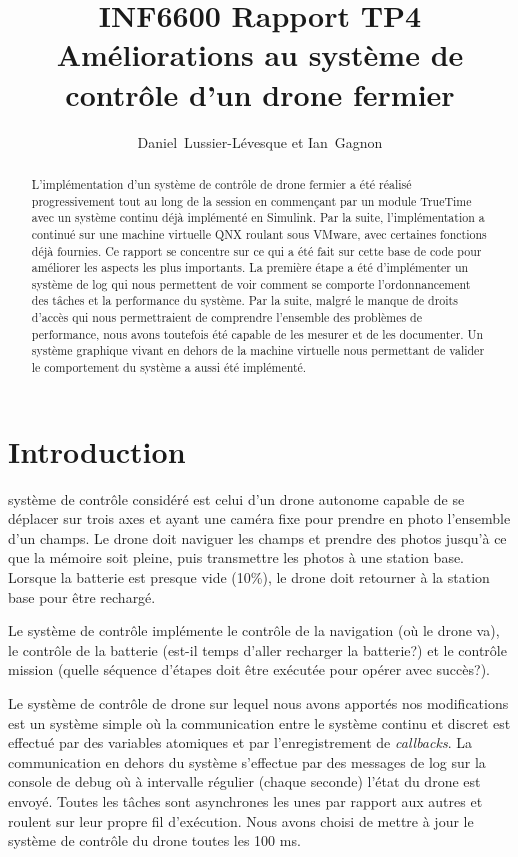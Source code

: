 \documentclass[journal]{IEEEtran}
\begin{document}
\title{INF6600 Rapport TP4 \\ Améliorations au système de contrôle d'un drone fermier}


\author{Daniel~Lussier-Lévesque et Ian~Gagnon}

\maketitle

\begin{abstract}
L'implémentation d'un système de contrôle de drone fermier a été réalisé progressivement tout au long de la session en commençant par un module TrueTime avec un système continu déjà implémenté en Simulink. Par la suite, l'implémentation a continué sur une machine virtuelle QNX roulant sous VMware, avec certaines fonctions déjà fournies. Ce rapport se concentre sur ce qui a été fait sur cette base de code pour améliorer les aspects les plus importants. La première étape a été d'implémenter un système de log qui nous permettent de voir comment se comporte l'ordonnancement des tâches et la performance du système. Par la suite, malgré le manque de droits d'accès qui nous permettraient de comprendre l'ensemble des problèmes de performance, nous avons toutefois été capable de les mesurer et de les documenter. Un système graphique vivant en dehors de la machine virtuelle nous permettant de valider le comportement du système a aussi été implémenté.
\end{abstract}


\section{Introduction}
 système de contrôle considéré est celui d'un drone autonome capable de se déplacer sur trois axes et ayant une caméra fixe pour prendre en photo l'ensemble d'un champs. Le drone doit naviguer les champs et prendre des photos jusqu'à ce que la mémoire soit pleine, puis transmettre les photos à une station base. Lorsque la batterie est presque vide (10\%), le drone doit retourner à la station base pour être rechargé. 

Le système de contrôle implémente le contrôle de la navigation (où le drone va), le contrôle de la batterie (est-il temps d'aller recharger la batterie?) et le contrôle mission (quelle séquence d'étapes doit être exécutée pour opérer avec succès?).

Le système de contrôle de drone sur lequel nous avons apportés nos modifications est un système simple où la communication entre le système continu et discret est effectué par des variables atomiques et par l'enregistrement de \textit{callbacks}. La communication en dehors du système s'effectue par des messages de log sur la console de debug où à intervalle régulier (chaque seconde) l'état du drone est envoyé. Toutes les tâches sont asynchrones les unes par rapport aux autres et roulent sur leur propre fil d'exécution. Nous avons choisi de mettre à jour le système de contrôle du drone toutes les 100 ms.
\end{document}
